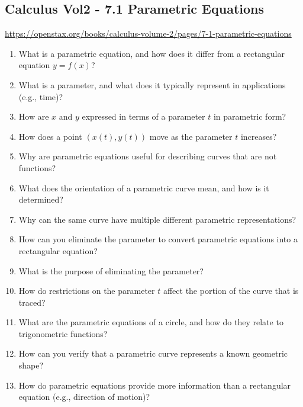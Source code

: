\subsection{Calculus Vol2 - 7.1 Parametric Equations}

\url{https://openstax.org/books/calculus-volume-2/pages/7-1-parametric-equations}

\begin{enumerate}

\item What is a parametric equation, and how does it differ from a rectangular equation $y=f(x)$?

\item What is a parameter, and what does it typically represent in applications (e.g., time)?

\item How are $x$ and $y$ expressed in terms of a parameter $t$ in parametric form?

\item How does a point $(x(t), y(t))$ move as the parameter $t$ increases?

\item Why are parametric equations useful for describing curves that are not functions?

\item What does the orientation of a parametric curve mean, and how is it determined?

\item Why can the same curve have multiple different parametric representations?

\item How can you eliminate the parameter to convert parametric equations into a rectangular equation?

\item What is the purpose of eliminating the parameter?

\item How do restrictions on the parameter $t$ affect the portion of the curve that is traced?

\item What are the parametric equations of a circle, and how do they relate to trigonometric functions?

\item How can you verify that a parametric curve represents a known geometric shape?

\item How do parametric equations provide more information than a rectangular equation (e.g., direction of motion)?


\end{enumerate}
